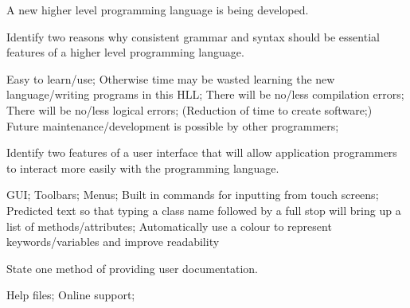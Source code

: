 \begin{exercise*}%
A new higher level programming language is being developed.
\begin{parts}
\item Identify two reasons why consistent grammar and syntax should be essential features of a higher level programming language.
\begin{solution}
Easy to learn/use;
Otherwise time may be wasted learning the new language/writing programs in this HLL;
There will be no/less compilation errors;
There will be no/less logical errors;
(Reduction of time to create software;)
Future maintenance/development is possible by other programmers;
\end{solution}

\item Identify two features of a user interface that will allow application programmers to interact more easily with the programming language.
\begin{solution}
GUI;
Toolbars;
Menus;
Built in commands for inputting from touch screens;
Predicted text so that typing a class name followed by a full stop will bring up a list of methods/attributes;
Automatically use a colour to represent keywords/variables and improve readability
\end{solution}

\item State one method of providing user documentation.
\begin{solution}
Help files;
Online support;
\end{solution}
\end{parts}



\end{exercise*}
